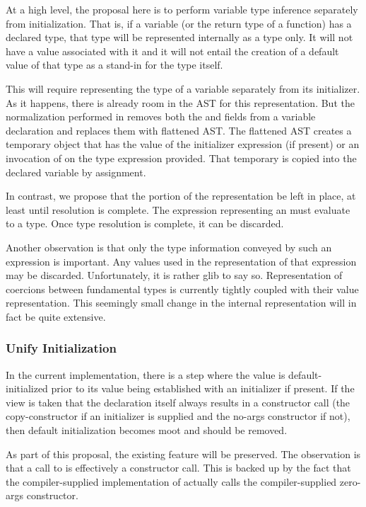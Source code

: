 At a high level, the proposal here is to perform variable type inference separately from
initialization.  That is, if a variable (or the return type of a function) has a declared type, that type will be represented internally as a type only.  It
will not have a value associated with it and it will not entail the creation of a default
value of that type as a stand-in for the type itself.

This will require representing the type of a variable separately from its
initializer.  As it happens, there is already room in the AST for this representation.
But the normalization performed in  removes both the 
and  fields from a variable declaration and replaces them with flattened AST.
The flattened AST creates a temporary object that has the value of the initializer
expression (if present) or an invocation of  on the type expression
provided.  That temporary is copied into the declared variable by assignment.  

In contrast, we propose that the  portion of the representation be left in
place, at least until resolution is complete.
The expression representing an  must evaluate to a type.  Once type
resolution is complete, it can be discarded.  

Another observation is that only the type information conveyed by such an expression is
important.  Any values used in the representation of that expression may be discarded.
Unfortunately, it is rather glib to say so.  Representation of coercions between
fundamental types is currently tightly coupled with their value representation.  This
seemingly small change in the internal representation will in fact be quite extensive.

\subsubsection{Unify Initialization}

In the current implementation, there is a step where the value is default-initialized
prior to its value being established with an initializer if present.  If the view is taken
that the declaration itself always results in a constructor call (the copy-constructor if
an initializer is supplied and the no-args constructor if not), then default
initialization becomes moot and should be removed.

As part of this proposal, the existing  feature will be preserved.  The
observation is that a call to  is effectively a constructor call.  This
is backed up by the fact that the compiler-supplied implementation of 
actually calls the compiler-supplied zero-args constructor.  

